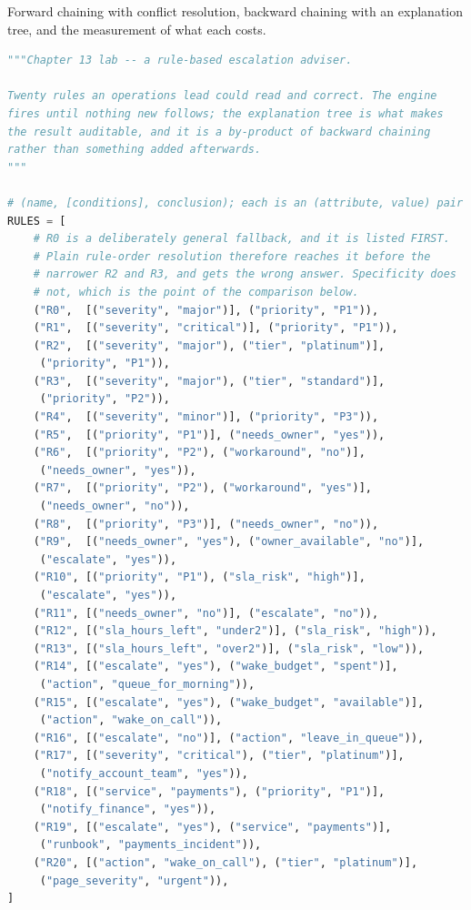 \begin{lab}
Forward chaining with conflict resolution, backward chaining with an explanation
tree, and the measurement of what each costs.
\begin{lstlisting}[language=Python]
"""Chapter 13 lab -- a rule-based escalation adviser.

Twenty rules an operations lead could read and correct. The engine
fires until nothing new follows; the explanation tree is what makes
the result auditable, and it is a by-product of backward chaining
rather than something added afterwards.
"""

# (name, [conditions], conclusion); each is an (attribute, value) pair
RULES = [
    # R0 is a deliberately general fallback, and it is listed FIRST.
    # Plain rule-order resolution therefore reaches it before the
    # narrower R2 and R3, and gets the wrong answer. Specificity does
    # not, which is the point of the comparison below.
    ("R0",  [("severity", "major")], ("priority", "P1")),
    ("R1",  [("severity", "critical")], ("priority", "P1")),
    ("R2",  [("severity", "major"), ("tier", "platinum")],
     ("priority", "P1")),
    ("R3",  [("severity", "major"), ("tier", "standard")],
     ("priority", "P2")),
    ("R4",  [("severity", "minor")], ("priority", "P3")),
    ("R5",  [("priority", "P1")], ("needs_owner", "yes")),
    ("R6",  [("priority", "P2"), ("workaround", "no")],
     ("needs_owner", "yes")),
    ("R7",  [("priority", "P2"), ("workaround", "yes")],
     ("needs_owner", "no")),
    ("R8",  [("priority", "P3")], ("needs_owner", "no")),
    ("R9",  [("needs_owner", "yes"), ("owner_available", "no")],
     ("escalate", "yes")),
    ("R10", [("priority", "P1"), ("sla_risk", "high")],
     ("escalate", "yes")),
    ("R11", [("needs_owner", "no")], ("escalate", "no")),
    ("R12", [("sla_hours_left", "under2")], ("sla_risk", "high")),
    ("R13", [("sla_hours_left", "over2")], ("sla_risk", "low")),
    ("R14", [("escalate", "yes"), ("wake_budget", "spent")],
     ("action", "queue_for_morning")),
    ("R15", [("escalate", "yes"), ("wake_budget", "available")],
     ("action", "wake_on_call")),
    ("R16", [("escalate", "no")], ("action", "leave_in_queue")),
    ("R17", [("severity", "critical"), ("tier", "platinum")],
     ("notify_account_team", "yes")),
    ("R18", [("service", "payments"), ("priority", "P1")],
     ("notify_finance", "yes")),
    ("R19", [("escalate", "yes"), ("service", "payments")],
     ("runbook", "payments_incident")),
    ("R20", [("action", "wake_on_call"), ("tier", "platinum")],
     ("page_severity", "urgent")),
]


\end{lstlisting}
\end{lab}
